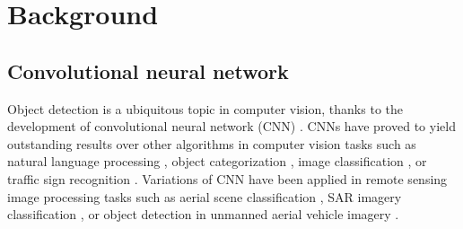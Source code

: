\documentclass[journal, 12pt, onecolumn,draftclsnofoot]{IEEEtran}
\begin{document}
%




\section{Background}\label{sec:background}
\subsection{Convolutional neural network}
Object detection is a ubiquitous topic in computer vision, thanks to the development of convolutional neural network (CNN) \cite{cnn}. CNNs have proved to yield outstanding results over other algorithms in computer vision tasks such as natural language processing \cite{cnn-nlp}, object categorization \cite{cnn-object}, image classification \cite{cnn-image,cnn-imagenet}, or traffic sign recognition \cite{trafficSign}. Variations of CNN have been applied in remote sensing image processing tasks \cite{Zhang2016} such as aerial scene classification \cite{aid, aerial-label, scene-multiscale}, SAR imagery classification \cite{sar-cnn}, or object detection in unmanned aerial vehicle imagery \cite{Bazi2018}.
\end{document}

